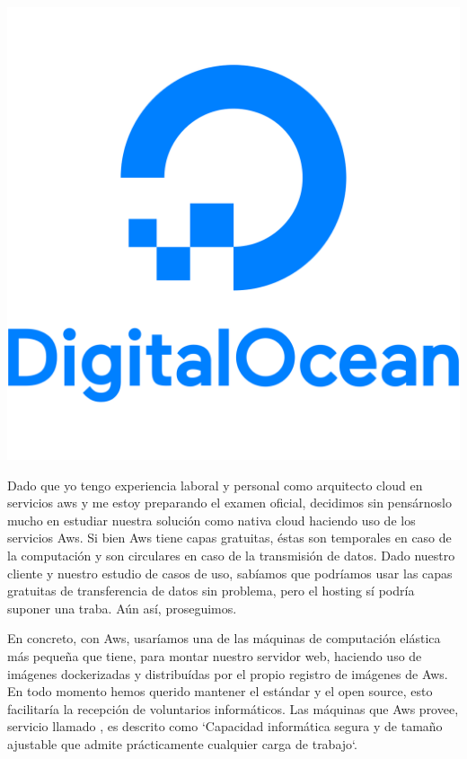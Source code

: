 \begin{table}[h]
\includegraphics[scale=0.08]{archivos/digitalocean.png}
\end{table}
\vspace{1em}
\par Dado que yo tengo experiencia laboral y personal como arquitecto cloud en servicios aws y me estoy preparando el examen oficial, decidimos sin pensárnoslo mucho en estudiar nuestra solución como nativa cloud haciendo uso de los servicios Aws. Si bien Aws tiene capas gratuitas, éstas son temporales en caso de la computación y son circulares en caso de la transmisión de datos. Dado nuestro cliente y nuestro estudio de casos de uso, sabíamos que podríamos usar las capas gratuitas de transferencia de datos sin problema, pero el hosting sí podría suponer una traba. Aún así, proseguimos.
\vspace{1em}
\par En concreto, con Aws, usaríamos una de las máquinas de computación elástica más pequeña que tiene, para montar nuestro servidor web, haciendo uso de imágenes dockerizadas y distribuídas por el propio registro de imágenes de Aws. En todo momento hemos querido mantener el estándar y el open source, esto facilitaría la recepción de voluntarios informáticos. Las máquinas que Aws provee, servicio llamado \citep{ec2AWS}, es descrito como `Capacidad informática segura y de tamaño ajustable que admite prácticamente cualquier carga de trabajo`.
